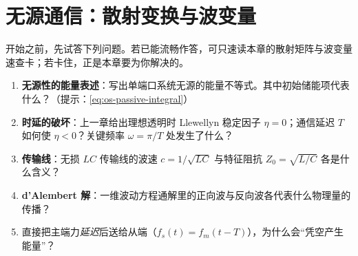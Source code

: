 \chapter{无源通信：散射变换与波变量}\label{ch:teleop-wave}


\begin{practice}[前置自测]
开始之前，先试答下列问题。若已能流畅作答，可只速读本章的散射矩阵与波变量速查卡；若卡住，正是本章要为你解决的。
\begin{enumerate}
  \item \textbf{无源性的能量表述}：写出单端口系统无源的能量不等式。其中初始储能项代表什么？（提示：\cref{eq:os-passive-integral}）
  \item \textbf{时延的破坏}：上一章给出理想透明时 Llewellyn 稳定因子 $\eta=0$；通信延迟 $T$ 如何使 $\eta<0$？关键频率 $\omega=\pi/T$ 处发生了什么？
  \item \textbf{传输线}：无损 $LC$ 传输线的波速 $c=1/\sqrt{LC}$ 与特征阻抗 $Z_0=\sqrt{L/C}$ 各是什么含义？
  \item \textbf{d'Alembert 解}：一维波动方程通解里的正向波与反向波各代表什么物理量的传播？
  \item 直接把主端力\emph{延迟}后送给从端（$f_s(t)=f_m(t-T)$），为什么会“凭空产生能量”？
\end{enumerate}
\end{practice}

